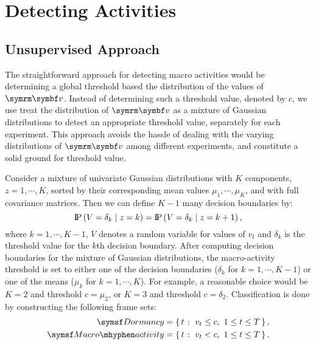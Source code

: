 \section{Detecting Activities}
\subsection{Unsupervised Approach}
The straightforward approach for detecting macro activities would be determining a global threshold based the distribution of the values of $\V{v}$.
Instead of determining such a threshold value, denoted by $c$, we use treat the distribution of $\V{v}$ as a mixture of Gaussian distributions to detect an appropriate threshold value, separately for each experiment.
This approach avoids the hassle of dealing with the varying distributions of $\V{v}$ among different experiments, and constitute a solid ground for threshold value.

Consider a mixture of univariate Gaussian distributions with $K$ components, $z=1, \cdots, K$, sorted by their corresponding mean values $\mu_1, \cdots, \mu_K$, and with full covariance matrices. Then we can define $K-1$ many decision boundaries by:
\begin{equation}
	\operatorname{\text{I\kern-0.15em P}} \left( V=\delta_k \;\middle|\; z=k \right) = \operatorname{\text{I\kern-0.15em P}} \left( V=\delta_k \;\middle|\; z=k+1 \right),
\end{equation}
where $k=1, \cdots, K-1$, $V$ denotes a random variable for values of $v_t$ and $\delta_k$ is the threshold value for the $k$th decision boundary.
After computing decision boundaries for the mixture of Gaussian distributions, the macro-activity threshold is set to either one of the decision boundaries ($\delta_k$ for $k=1, \cdots, K-1$) or one of the means ($\mu_k$ for $k=1, \cdots, K$).
For example, a reasonable choice would be $K=2$ and threshold $c=\mu_2$, or $K=3$ and threshold $c=\delta_2$.
Classification is done by constructing the following frame sets:
\begin{equation}
	\begin{aligned}
		\Dormancy      & =\Set{t}{v_t \leq c, \ 1\leq t \leq T}, \\
		\MacroActivity & =\Set{t}{v_t<c, \ 1\leq t \leq T}.
	\end{aligned}
\end{equation}

